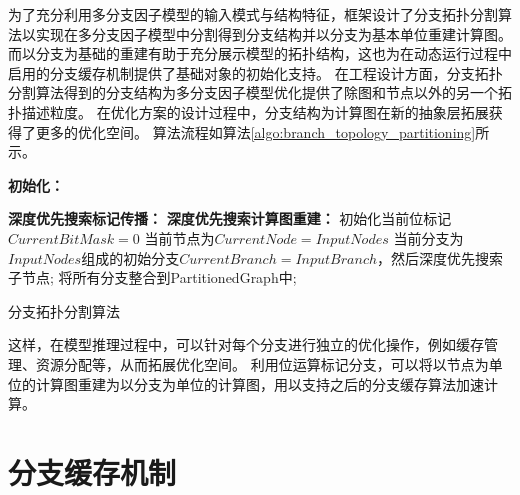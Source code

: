 为了充分利用多分支因子模型的输入模式与结构特征，框架设计了分支拓扑分割算法以实现在多分支因子模型中分割得到分支结构并以分支为基本单位重建计算图。
而以分支为基础的重建有助于充分展示模型的拓扑结构，这也为在动态运行过程中启用的分支缓存机制提供了基础对象的初始化支持。
在工程设计方面，分支拓扑分割算法得到的分支结构为多分支因子模型优化提供了除图和节点以外的另一个拓扑描述粒度。
在优化方案的设计过程中，分支结构为计算图在新的抽象层拓展获得了更多的优化空间。
算法流程如算法\ref{algo:branch_topology_partitioning}所示。
\begin{algorithm}[h]
    \textbf{初始化：}\;
    
    \textbf{深度优先搜索标记传播：}\;
    \textbf{深度优先搜索计算图重建：}\;
    初始化当前位标记$CurrentBitMask = 0$\;
    当前节点为$CurrentNode = InputNodes$\;
    当前分支为$InputNodes$组成的初始分支$CurrentBranch = InputBranch$，然后深度优先搜索子节点;
    将所有分支整合到PartitionedGraph中;

    \caption{分支拓扑分割算法}
    \label{algo:branch_topology_partitioning}
\end{algorithm}

这样，在模型推理过程中，可以针对每个分支进行独立的优化操作，例如缓存管理、资源分配等，从而拓展优化空间。
利用位运算标记分支，可以将以节点为单位的计算图重建为以分支为单位的计算图，用以支持之后的分支缓存算法加速计算。

\section{分支缓存机制}

